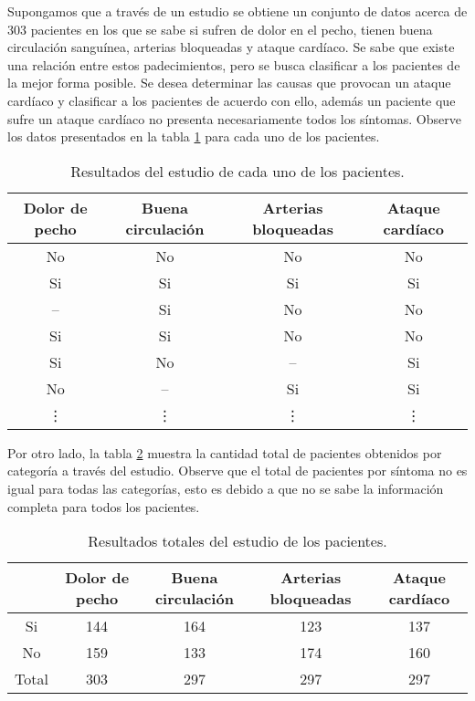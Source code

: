 \documentclass[
10pt, %
a4paper, %
]{article}
\begin{document}
Supongamos que a través de un estudio se obtiene un conjunto de datos acerca de 303 pacientes en los que se sabe si sufren de dolor en el pecho, tienen buena
circulación sanguínea, arterias bloqueadas y ataque cardíaco. Se sabe que existe una relación entre estos padecimientos, pero se busca clasificar a los pacientes 
de la mejor forma posible. Se desea determinar las causas que provocan un ataque cardíaco y clasificar a los pacientes de acuerdo con ello, además un paciente que
sufre un ataque cardíaco no presenta necesariamente todos los síntomas. Observe los datos presentados en la tabla \ref{tab:datosPacientes} para cada uno de los
pacientes. 

\begin{table}
	\centering
	\begin{tabular}{c|c|c|c}
		\toprule
		Dolor de pecho & Buena circulación & Arterias bloqueadas & Ataque cardíaco \\
		\midrule		
		No & No & No & No \\\midrule
		Si & Si & Si & Si \\\midrule
		-- & Si & No & No \\\midrule
		Si & Si & No & No \\\midrule
		Si & No & -- & Si \\\midrule
		No & -- & Si & Si \\\midrule
		\vdots & \vdots & \vdots & \vdots \\
		\bottomrule
	\end{tabular}
	\caption{Resultados del estudio de cada uno de los pacientes.}
	\label{tab:datosPacientes}
\end{table}

Por otro lado, la tabla \ref{tab:datosTotalesPacientes} muestra la cantidad total de pacientes obtenidos por categoría a través del estudio. Observe que el total 
de pacientes por síntoma no es igual para todas las categorías, esto es debido a que no se sabe la información completa para todos los pacientes. 

\begin{table}
	\centering
	\begin{tabular}{c|c|c|c|c}
		\toprule
		 & Dolor de pecho & Buena circulación & Arterias bloqueadas & Ataque cardíaco \\
		\midrule		
		Si & 144 & 164 & 123 & 137 \\\midrule
		No & 159 & 133 & 174 & 160 \\\midrule
		Total & 303 & 297 & 297 & 297\\
		\bottomrule
	\end{tabular}
	\caption{Resultados totales del estudio de los pacientes.}
	\label{tab:datosTotalesPacientes}
\end{table}
\end{document}
